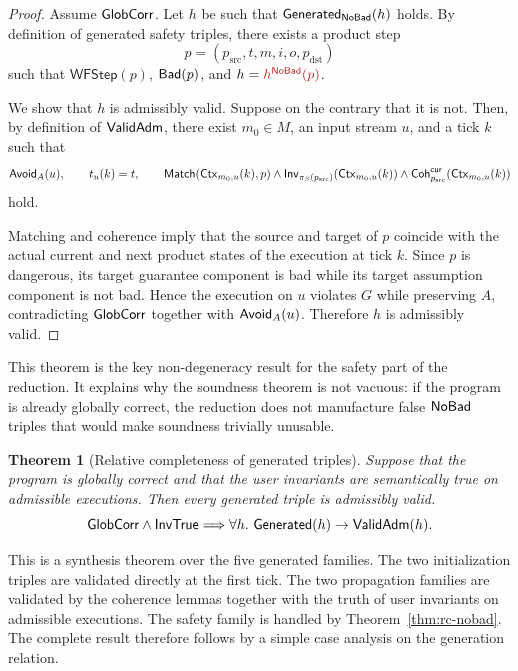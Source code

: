 \documentclass[acmsmall,screen]{acmart}
\theoremstyle{leftplain}
\newtheorem{theorem}{Theorem}
\theoremstyle{leftdefinition}
\theoremstyle{leftremark}
\begin{document}
\begin{proof}
Assume $\mathsf{GlobCorr}$. Let $h$ be such that $\mathsf{Generated}_{\mathsf{NoBad}}(h)$ holds. By
definition of generated safety triples, there exists a product step
\[
  p=(p_{\mathrm{src}},t,m,i,o,p_{\mathrm{dst}})
\]
such that $\mathsf{WFStep}(p)$, $\mathsf{Bad}(p)$, and $h = \triplesafe{h^{\NoBad}(p)}$.

We show that $h$ is admissibly valid. Suppose on the contrary that it is not.
Then, by definition of $\mathsf{ValidAdm}$, there exist $m_0 \in M$, an input stream
$u$, and a tick $k$ such that
\[
  \mathsf{Avoid}_A(u),
  \qquad
  t_u(k)=t,
  \qquad
  \mathsf{Match}(\mathsf{Ctx}_{m_0,u}(k),p)
  \wedge \mathsf{Inv}_{\pi_S(p_{\mathrm{src}})}(\mathsf{Ctx}_{m_0,u}(k))
  \wedge \mathsf{Coh}^{\mathsf{cur}}_{p_{\mathrm{src}}}(\mathsf{Ctx}_{m_0,u}(k))
\]
hold.

Matching and
coherence imply that the source and target of $p$ coincide with the actual
current and next product states of the execution at tick $k$. Since $p$ is
dangerous, its target guarantee component is bad while its target assumption
component is not bad. Hence the execution on $u$ violates $G$ while preserving
$A$, contradicting $\mathsf{GlobCorr}$ together with $\mathsf{Avoid}_A(u)$. Therefore $h$ is
admissibly valid.
\end{proof}

This theorem is the key non-degeneracy result for the safety part of the
reduction. It explains why the soundness theorem is not vacuous: if the program
is already globally correct, the reduction does not manufacture false $\mathsf{NoBad}$
triples that would make soundness trivially unusable.

\begin{theorem}[Relative completeness of generated triples]
\label{thm:rc-generated}
Suppose that the program is globally
correct and that the user invariants are semantically true on admissible
executions. Then every generated triple is admissibly valid.
\[
  \mathsf{GlobCorr} \wedge \mathsf{InvTrue} \Longrightarrow
  \forall h.\ \mathsf{Generated}(h) \rightarrow \mathsf{ValidAdm}(h).
\]
\end{theorem}

\noindent{}
This is a synthesis theorem over the five generated families. The two
initialization triples are validated directly at the first tick. The two
propagation families are validated by the coherence lemmas together with the
truth of user invariants on admissible executions. The safety family is handled by
Theorem~\ref{thm:rc-nobad}. The complete result therefore follows by a simple
case analysis on the generation relation.
\end{document}
